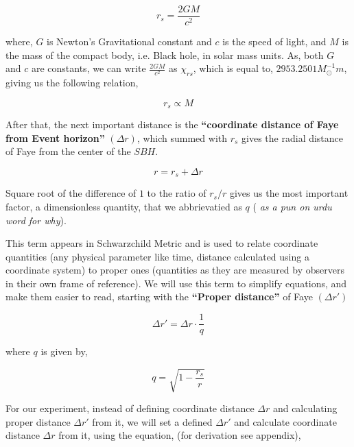 \documentclass[9pt,a4paper,twocolumn,twoside]{tau-class/tau}
\begin{document}
    \begin{equation} \label{eq: rs}
        \boxed{r_s = \frac{2GM}{c^2}}
    \end{equation}

    where, \(G\) is Newton's Gravitational constant and \(c\) is the speed of light, and \(M\) is the mass of the compact body, i.e. Black hole, in solar mass units. As, both \(G\) and \(c\) are constants, we can write \(\frac{2GM}{c^2}\) as \(\chi_{rs}\), which is equal to, \(2953.2501 M_{\odot}^{-1}m\), giving us the following relation, 

    \begin{equation}
        \boxed{r_s \propto M}
    \end{equation}

    After that, the next important distance is the \textbf{``coordinate distance of Faye from Event horizon''} \((\Delta r)\), which summed with \(r_s\) gives the radial distance of Faye from the center of the \(SBH\).

    \begin{equation} \label{eq: r}
        \boxed{r = r_s + \Delta r}
    \end{equation}

    Square root of the difference of \(1\) to the ratio of \(r_s/r \) gives us the most important factor, a dimensionless quantity, that we abbrievatied as \(q\) (\textit{ as a pun on urdu word for why}).
    
    
    This term appears in Schwarzchild Metric and is used to relate coordinate quantities (any physical parameter like time, distance calculated using a coordinate system) to proper ones (quantities as they are measured by observers in their own frame of reference). We will use this term to simplify equations, and make them easier to read, starting with the \textbf{``Proper distance''} of Faye \((\Delta r')\)

    \begin{equation} \label{eq: qr}
        \boxed{\Delta r' = \Delta r \cdot \frac{1}{q}}
    \end{equation}

    where \(q\) is given by, 

    \begin{equation} \label{eq: q}
        \boxed{q = \sqrt{1 - \frac{r_s}{r}}} 
    \end{equation}

    For our experiment, instead of defining coordinate distance \(\Delta r\) and calculating proper distance \(\Delta r'\) from it, we will set a defined \(\Delta r'\) and calculate coordinate distance \(\Delta r\) from it, using the equation, (for derivation see appendix), 
\end{document}
